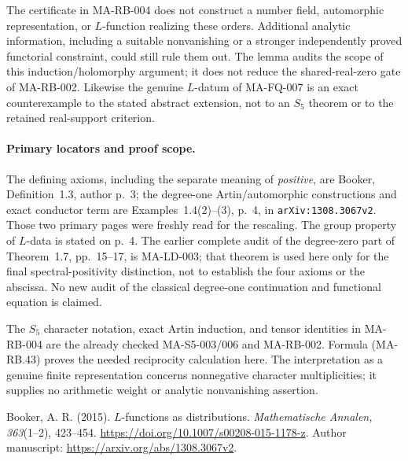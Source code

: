 The certificate in MA-RB-004 does not construct a number
field, automorphic representation, or $L$-function realizing
these orders.  Additional analytic information, including
a suitable nonvanishing or a stronger independently proved
functorial constraint, could still rule them out.  The lemma
audits the scope of this induction/holomorphy argument; it
does not reduce the shared-real-zero gate of MA-RB-002.
Likewise the genuine $L$-datum of MA-FQ-007 is an exact
counterexample to the stated abstract extension, not to an
$S_5$ theorem or to the retained real-support criterion.

\paragraph{Primary locators and proof scope.}
The defining axioms, including the separate meaning of
\emph{positive}, are Booker, Definition~1.3, author p.~3;
the degree-one Artin/automorphic constructions and exact
conductor term are Examples~1.4(2)--(3), p.~4, in
\texttt{arXiv:1308.3067v2}.  Those two primary pages were
freshly read for the rescaling.  The group property of
$L$-data is stated on p.~4.  The earlier complete audit
of the degree-zero part of Theorem~1.7, pp.~15--17, is
MA-LD-003; that theorem is used here only for the final
spectral-positivity distinction, not to establish the four
axioms or the abscissa.  No new audit of the classical
degree-one continuation and functional equation is claimed.

The $S_5$ character notation, exact Artin induction, and
tensor identities in MA-RB-004 are the already checked
MA-S5-003/006 and MA-RB-002.  Formula (MA-RB.43) proves
the needed reciprocity calculation here.  The interpretation
as a genuine finite representation concerns nonnegative
character multiplicities; it supplies no arithmetic weight
or analytic nonvanishing assertion.

Booker, A. R. (2015). $L$-functions as distributions.
\emph{Mathematische Annalen, 363}(1--2), 423--454.
\url{https://doi.org/10.1007/s00208-015-1178-z}.
Author manuscript: \url{https://arxiv.org/abs/1308.3067v2}.
